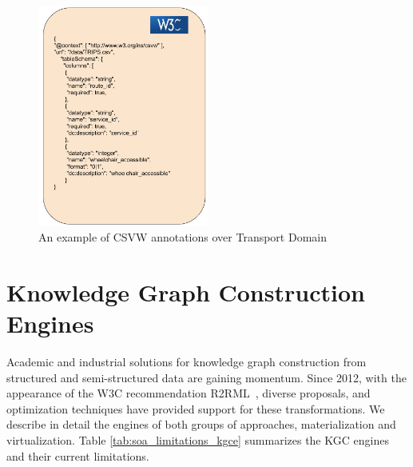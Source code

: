 \begin{figure}[!t]
\centering
\includegraphics[width=0.5\textwidth]{figures/state-of-the-art/CVSW example.pdf}
\caption{An example of CSVW annotations over Transport Domain}
\label{fig:soa_csvw_example}
\end{figure}





\section{Knowledge Graph Construction Engines}
\label{sec:soa_engines}
Academic and industrial solutions for knowledge graph construction from structured and semi-structured data are gaining momentum. Since 2012, with the appearance of the W3C recommendation R2RML~\citep{R2RML}, diverse proposals, and optimization techniques have provided support for these transformations. We describe in detail the engines of both groups of approaches, materialization and virtualization. Table \ref{tab:soa_limitations_kgce} summarizes the KGC engines and their current limitations.

